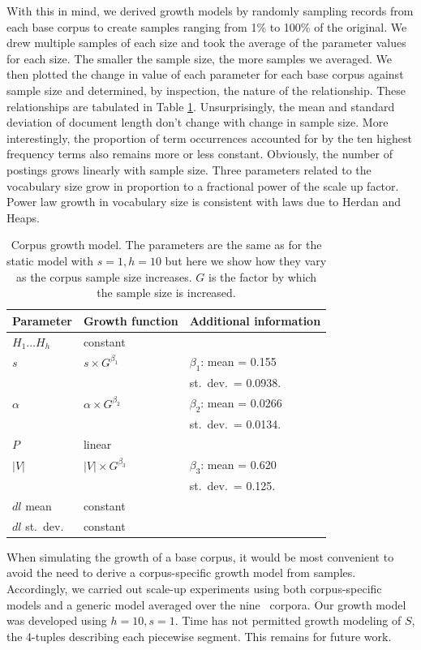 \documentclass[11pt]{report}
\newcommand{\numcolls}{nine}
\begin{document}
With this in mind, we derived growth models by randomly sampling
records from each base corpus to create samples ranging from 1\% to
100\% of the original.  We drew multiple samples of each size and took
the average of the parameter values for each size. The smaller the
sample size, the more samples we averaged.  We then plotted the change
in value of each parameter for each base corpus against sample size and 
determined, by inspection, the nature of the relationship.  These
relationships are tabulated in Table \ref{dynmodparams}.
Unsurprisingly, the mean and standard deviation of document length
don't change with change in sample size.  More interestingly, the
proportion of term occurrences accounted for by the ten highest
frequency terms also remains more or less constant.  Obviously,
the number of postings grows linearly with sample size.  Three
parameters related to the vocabulary size grow in proportion to a
fractional power of the scale up factor.  Power law growth in
vocabulary size is consistent with laws due to Herdan and Heaps. 


\begin{table} \centering
\caption{Corpus growth model. The parameters are the same as
  for the static model with $s=1, h=10$ but here we show how they vary as the corpus sample
  size increases.  $G$ is the factor by which the sample size is increased.
\label{dynmodparams}}
\begin{tabular}{lll}
Parameter & Growth function & Additional information\\
\hline
$H_1\ldots H_{h}$&constant&\\
$s$&$s \times G^{\beta_1}$&$\beta_1$: mean = 0.155\\
&& st.~dev.~= 0.0938.\\
$\alpha$&$\alpha \times G^{\beta_2}$&$\beta_2$: mean = 0.0266\\
&& st.~dev.~= 0.0134.\\
$P$&linear & \\
$|V|$& $|V| \times G^{\beta_3}$&$\beta_3$: mean = 0.620\\
&& st.~dev.~= 0.125.\\
$\mathit{dl}$ mean & constant & \\
$\mathit{dl}$ st.~dev. & constant & \\
\hline
\end{tabular}
\end{table}


When simulating the growth of a base corpus, it would be most
convenient to avoid the need to derive a corpus-specific growth model
from samples.  Accordingly, we carried out scale-up experiments using
both corpus-specific models and a generic model averaged over the
\numcolls~ corpora.  Our growth model was developed using $h=10, s=1$.
Time has not permitted growth modeling of $S$, the 4-tuples describing
each piecewise segment.  This remains for future work.
\end{document}
